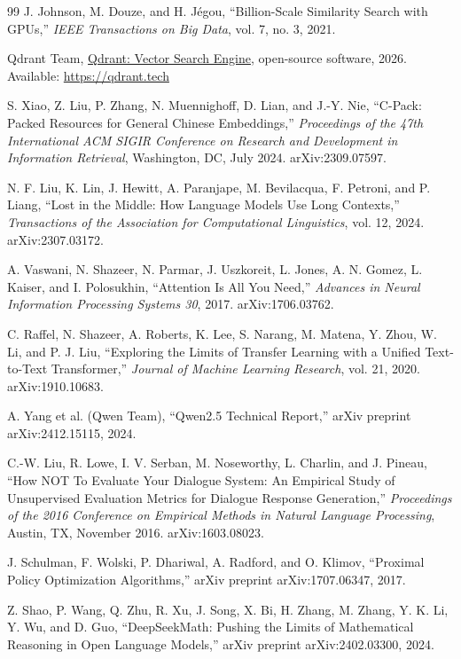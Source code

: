 \documentclass[12pt,letterpaper,oneside]{report}
\newcommand{\booktitle}[1]{\uline{#1}}
\begin{document}
\begin{thebibliography}{99}
 J. Johnson, M. Douze, and H. J\'{e}gou,
``Billion-Scale Similarity Search with GPUs,'' \emph{IEEE Transactions on Big
Data}, vol. 7, no. 3, 2021.

 Qdrant Team, \booktitle{Qdrant: Vector Search Engine}, open-source software, 2026. Available: \url{https://qdrant.tech}

 S. Xiao, Z. Liu, P. Zhang, N. Muennighoff,
D. Lian, and J.-Y. Nie, ``C-Pack: Packed Resources for General Chinese
Embeddings,'' \emph{Proceedings of the 47th International ACM SIGIR Conference
on Research and Development in Information Retrieval}, Washington, DC, July
2024. arXiv:2309.07597.

 N. F. Liu, K. Lin, J. Hewitt,
A. Paranjape, M. Bevilacqua, F. Petroni, and P. Liang, ``Lost in the Middle:
How Language Models Use Long Contexts,'' \emph{Transactions of the Association
for Computational Linguistics}, vol. 12, 2024. arXiv:2307.03172.

 A. Vaswani, N. Shazeer, N. Parmar,
J. Uszkoreit, L. Jones, A. N. Gomez, L. Kaiser, and I. Polosukhin, ``Attention
Is All You Need,'' \emph{Advances in Neural Information Processing Systems 30},
2017. arXiv:1706.03762.

 C. Raffel, N. Shazeer, A. Roberts, K. Lee,
S. Narang, M. Matena, Y. Zhou, W. Li, and P. J. Liu, ``Exploring the Limits of
Transfer Learning with a Unified Text-to-Text Transformer,'' \emph{Journal of
Machine Learning Research}, vol. 21, 2020. arXiv:1910.10683.

 A. Yang et al. (Qwen Team), ``Qwen2.5 Technical
Report,'' arXiv preprint arXiv:2412.15115, 2024.

 C.-W. Liu, R. Lowe, I. V. Serban,
M. Noseworthy, L. Charlin, and J. Pineau, ``How NOT To Evaluate Your Dialogue
System: An Empirical Study of Unsupervised Evaluation Metrics for Dialogue
Response Generation,'' \emph{Proceedings of the 2016 Conference on Empirical
Methods in Natural Language Processing}, Austin, TX, November 2016.
arXiv:1603.08023.

 J. Schulman, F. Wolski, P. Dhariwal, A. Radford,
and O. Klimov, ``Proximal Policy Optimization Algorithms,'' arXiv preprint
arXiv:1707.06347, 2017.

 Z. Shao, P. Wang, Q. Zhu, R. Xu, J. Song,
X. Bi, H. Zhang, M. Zhang, Y. K. Li, Y. Wu, and D. Guo, ``DeepSeekMath: Pushing
the Limits of Mathematical Reasoning in Open Language Models,'' arXiv preprint
arXiv:2402.03300, 2024.


\end{thebibliography}
\end{document}
